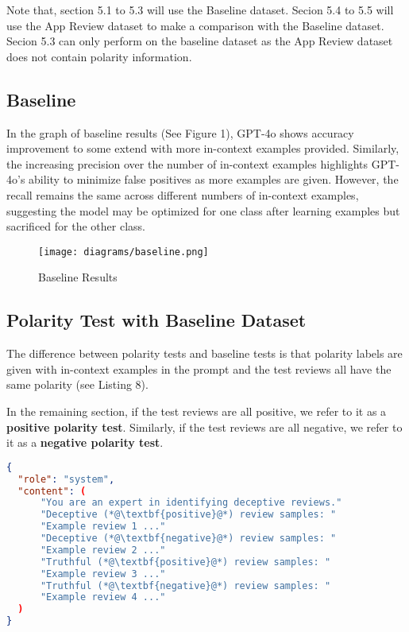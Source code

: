 \documentclass[sigconf, nonacm]{acmart}
\theoremstyle{definition}
\begin{document}
Note that, section 5.1 to 5.3 will use the Baseline dataset. Secion 5.4 to 5.5 will use the App Review dataset to make a comparison with the Baseline dataset. Secion 5.3 can only perform on the baseline dataset as the App Review dataset does not contain polarity information.

\subsection{Baseline}
In the graph of baseline results (See Figure 1), GPT-4o shows accuracy improvement to some extend with more in-context examples provided. Similarly, the increasing precision over the number of in-context examples highlights GPT-4o's ability to minimize false positives as more examples are given. However, the recall remains the same across different numbers of in-context examples, suggesting the model may be optimized for one class after learning examples but sacrificed for the other class.

\begin{figure}[h]
  \centering
  \texttt{[image: diagrams/baseline.png]}
  \caption{Baseline Results}
\end{figure}

\subsection{Polarity Test with Baseline Dataset}
The difference between polarity tests and baseline tests is that polarity labels are given with in-context examples in the prompt and the test reviews all have the same polarity (see Listing 8).

In the remaining section, if the test reviews are all positive, we refer to it as a \textbf{positive polarity test}. Similarly, if the test reviews are all negative, we refer to it as a \textbf{negative polarity test}.

\begin{lstlisting}[language=json, caption={System Messages for Polarity Test}]
{
  "role": "system",
  "content": (
      "You are an expert in identifying deceptive reviews."
      "Deceptive (*@\textbf{positive}@*) review samples: "
      "Example review 1 ..."
      "Deceptive (*@\textbf{negative}@*) review samples: "
      "Example review 2 ..."
      "Truthful (*@\textbf{positive}@*) review samples: "
      "Example review 3 ..."
      "Truthful (*@\textbf{negative}@*) review samples: "
      "Example review 4 ..."
  )
}
\end{lstlisting}
\end{document}

